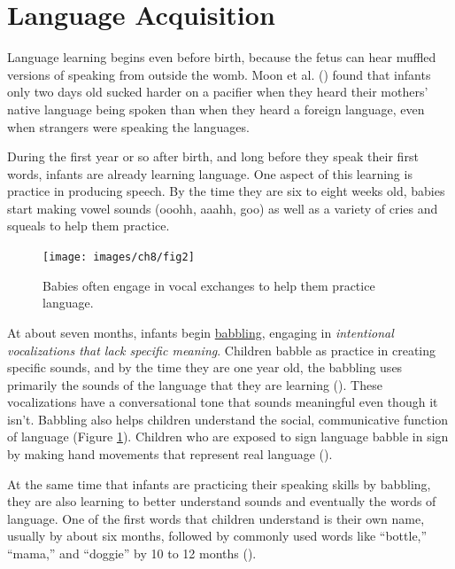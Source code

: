 \documentclass[
]{krantz}
\begin{document}
\section{Language Acquisition}\label{language-acquisition}

Language learning begins even before birth, because the fetus can hear muffled versions of speaking from outside the womb. Moon et al. () found that infants only two days old sucked harder on a pacifier when they heard their mothers' native language being spoken than when they heard a foreign language, even when strangers were speaking the languages.

During the first year or so after birth, and long before they speak their first words, infants are already learning language. One aspect of this learning is practice in producing speech. By the time they are six to eight weeks old, babies start making vowel sounds (ooohh, aaahh, goo) as well as a variety of cries and squeals to help them practice.

\begin{figure}

{\centering \texttt{[image: images/ch8/fig2]} 

}

\caption{Babies often engage in vocal exchanges to help them practice language.}\label{fig:practicing}
\end{figure}

At about seven months, infants begin \hyperref[babbling]{babbling}, engaging in \emph{intentional vocalizations that lack specific meaning}. Children babble as practice in creating specific sounds, and by the time they are one year old, the babbling uses primarily the sounds of the language that they are learning (). These vocalizations have a conversational tone that sounds meaningful even though it isn't. Babbling also helps children understand the social, communicative function of language (Figure \ref{fig:practicing}). Children who are exposed to sign language babble in sign by making hand movements that represent real language ().

At the same time that infants are practicing their speaking skills by babbling, they are also learning to better understand sounds and eventually the words of language. One of the first words that children understand is their own name, usually by about six months, followed by commonly used words like ``bottle,'' ``mama,'' and ``doggie'' by 10 to 12 months ().
\end{document}
